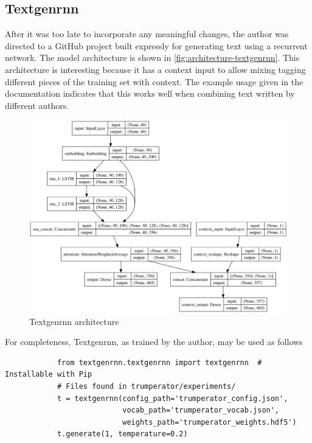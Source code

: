 \documentclass[letterpaper]{article}
\begin{document}
    \subsection{Textgenrnn}
        After it was too late to incorporate any meaningful changes, the author was directed to a GitHub project \citep{woolf_2017} built expressly for generating text using a recurrent network. The model architecture is shown in \autoref{fig:architecture-textgenrnn}. This architecture is interesting because it has a context input to allow mixing tagging different pieces of the training set with context. The example usage given in the documentation indicates that this works well when combining text written by different authors.

        \begin{figure}[h]
            \centering
            \includegraphics[width=\textwidth]{figures/context_model.png}
            \caption{Textgenrnn architecture}\label{fig:architecture-textgenrnn}
        \end{figure}

        For completeness, Textgenrnn, as trained by the author, may be used as follows

        \begin{verbatim}
            from textgenrnn.textgenrnn import textgenrnn  # Installable with Pip
            # Files found in trumperator/experiments/
            t = textgenrnn(config_path='trumperator_config.json',
                           vocab_path='trumperator_vocab.json',
                           weights_path='trumperator_weights.hdf5')
            t.generate(1, temperature=0.2)
        \end{verbatim}
\end{document}
